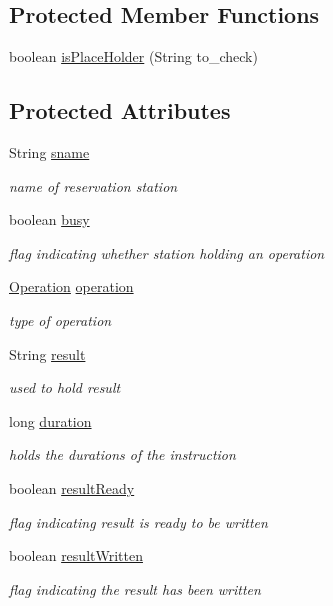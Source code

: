 \subsection*{\-Protected \-Member \-Functions}
\begin{DoxyCompactItemize}
\item 
boolean \hyperlink{classReservationStation_a273bb4bbfdc3c1c481815ce690424bb7}{is\-Place\-Holder} (\-String to\-\_\-check)
\end{DoxyCompactItemize}
\subsection*{\-Protected \-Attributes}
\begin{DoxyCompactItemize}
\item 
\-String \hyperlink{classReservationStation_a2c0bd5b95f126395b0ab081394f090f6}{sname}
\begin{DoxyCompactList}\small\item\em name of reservation station \end{DoxyCompactList}\item 
boolean \hyperlink{classReservationStation_a0a2668bbae4e5d78dca63e3d38b4909f}{busy}
\begin{DoxyCompactList}\small\item\em flag indicating whether station holding an operation \end{DoxyCompactList}\item 
\hyperlink{classOperation}{\-Operation} \hyperlink{classReservationStation_a5dd33977e49327535ed47746caecd956}{operation}
\begin{DoxyCompactList}\small\item\em type of operation \end{DoxyCompactList}\item 
\-String \hyperlink{classReservationStation_a7d8ec53057e9762a0592c8052704fd88}{result}
\begin{DoxyCompactList}\small\item\em used to hold result \end{DoxyCompactList}\item 
long \hyperlink{classReservationStation_aa5e7a4c5ed6fd7e5e97782deb8feeeaa}{duration}
\begin{DoxyCompactList}\small\item\em holds the durations of the instruction \end{DoxyCompactList}\item 
boolean \hyperlink{classReservationStation_affeac0d7f9f9199919042bdb66ba2f73}{result\-Ready}
\begin{DoxyCompactList}\small\item\em flag indicating result is ready to be written \end{DoxyCompactList}\item 
boolean \hyperlink{classReservationStation_af3a98e6cc1d9b79263ed8848295fa29c}{result\-Written}
\begin{DoxyCompactList}\small\item\em flag indicating the result has been written \end{DoxyCompactList}\end{DoxyCompactItemize}
